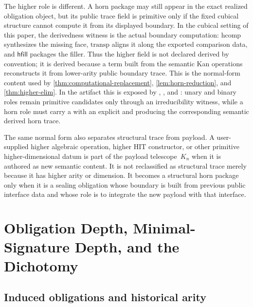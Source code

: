 \documentclass{lmcs}
\newcommand{\hcomp}{\mathrm{hcomp}}
\newcommand{\transp}{\mathrm{transp}}
\begin{document}
The higher role is different. A horn package may still appear in the exact
realized obligation object, but its public trace field is primitive only if the
fixed cubical structure cannot compute it from its displayed boundary. In the
cubical setting of this paper, the derivedness witness is the actual boundary
computation: $\hcomp$ synthesizes the missing face, $\transp$ aligns it along
the exported comparison data, and $\mathsf{hfill}$ packages the filler. Thus
the higher field is not declared derived by convention; it is derived because a
term built from the semantic Kan operations reconstructs it from lower-arity
public boundary trace. This is the normal-form content used by
\autoref{thm:computational-replacement}, \autoref{lem:horn-reduction}, and
\autoref{thm:higher-elim}. In the artifact this is exposed by
, , and
: unary and binary roles remain
primitive candidates only through an irreducibility witness, while a horn role
must carry a  with an explicit
 and  producing the
corresponding semantic derived horn trace.

The same normal form also separates structural trace from payload. A
user-supplied higher algebraic operation, higher HIT constructor, or other
primitive higher-dimensional datum is part of the payload telescope~$K_n$ when
it is authored as new semantic content. It is not reclassified as structural
trace merely because it has higher arity or dimension. It becomes a structural
horn package only when it is a sealing obligation whose boundary is built from
previous public interface data and whose role is to integrate the new payload
with that interface.

\section{Obligation Depth, Minimal-Signature Depth, and the Dichotomy}
\label{sec:coherence}

\subsection{Induced obligations and historical arity}
\end{document}
